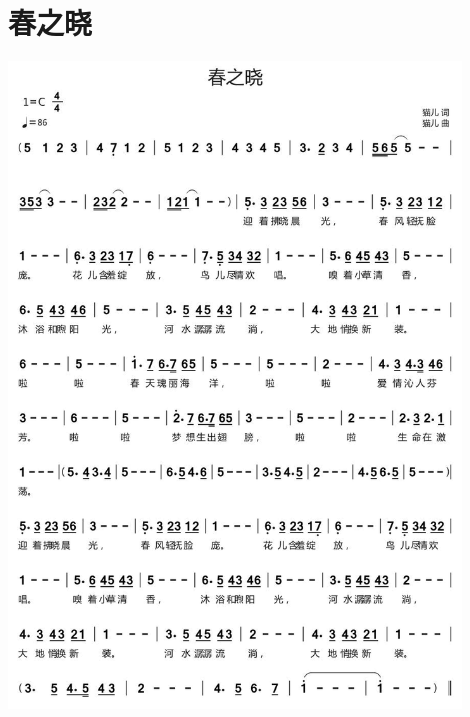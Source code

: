 \documentclass[cn,pad,twocol]{elegantbook}
\begin{document}
\section{春之晓} \includegraphics[width=0.9\textwidth]{macos/20210208春之晓.png}
\end{document}
